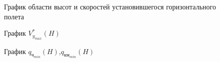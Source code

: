 \begin{figure}[H]
\centering

\caption{График области высот и скоростей установившегося горизонтального полета}
\label{fig:H_M}
\end{figure}

\begin{figure}[H]
    \centering
    \resizebox{.79\linewidth}{!}{}
    \caption{График $V_{y_{max}}^*(H)$}
    \label{fig:H_v_celling}
\end{figure}

\begin{figure}[H]
    \centering
    \resizebox{.79\linewidth}{!}{}
    \caption{График $q_{ч_{min}}(H)$,$q_{км_{min}}(H)$}
    \label{fig:q_min_H}
\end{figure}

